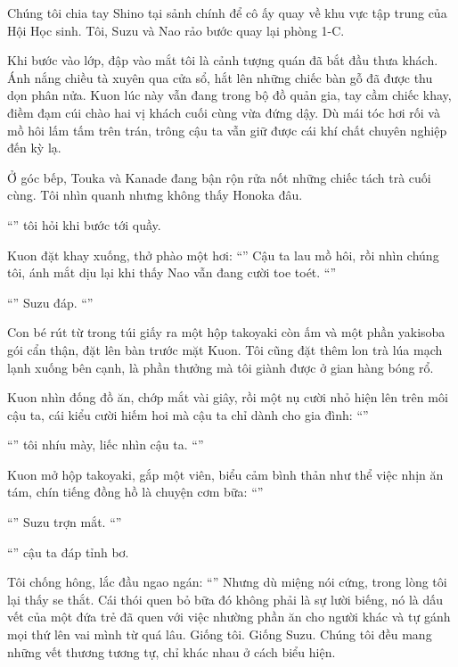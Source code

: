 \documentclass[../main.tex]{subfiles}
\begin{document}
Chúng tôi chia tay Shino tại sảnh chính để cô ấy quay về khu vực tập trung của Hội Học sinh. Tôi, Suzu và Nao rảo bước quay lại phòng 1-C.

Khi bước vào lớp, đập vào mắt tôi là cảnh tượng quán đã bắt đầu thưa khách. Ánh nắng chiều tà xuyên qua cửa sổ, hắt lên những chiếc bàn gỗ đã được thu dọn phân nửa. Kuon lúc này vẫn đang trong bộ đồ quản gia, tay cầm chiếc khay, điềm đạm cúi chào hai vị khách cuối cùng vừa đứng dậy. Dù mái tóc hơi rối và mồ hôi lấm tấm trên trán, trông cậu ta vẫn giữ được cái khí chất chuyên nghiệp đến kỳ lạ.

Ở góc bếp, Touka và Kanade đang bận rộn rửa nốt những chiếc tách trà cuối cùng. Tôi nhìn quanh nhưng không thấy Honoka đâu.

``'' tôi hỏi khi bước tới quầy.

Kuon đặt khay xuống, thở phào một hơi: ``'' Cậu ta lau mồ hôi, rồi nhìn chúng tôi, ánh mắt dịu lại khi thấy Nao vẫn đang cười toe toét. ``''

``'' Suzu đáp. ``''

Con bé rút từ trong túi giấy ra một hộp takoyaki còn ấm và một phần yakisoba gói cẩn thận, đặt lên bàn trước mặt Kuon. Tôi cũng đặt thêm lon trà lúa mạch lạnh xuống bên cạnh, là phần thưởng mà tôi giành được ở gian hàng bóng rổ.

Kuon nhìn đống đồ ăn, chớp mắt vài giây, rồi một nụ cười nhỏ hiện lên trên môi cậu ta, cái kiểu cười hiếm hoi mà cậu ta chỉ dành cho gia đình: ``''

``'' tôi nhíu mày, liếc nhìn cậu ta. ``''

Kuon mở hộp takoyaki, gắp một viên, biểu cảm bình thản như thể việc nhịn ăn tám, chín tiếng đồng hồ là chuyện cơm bữa: ``''

``'' Suzu trợn mắt. ``''

``'' cậu ta đáp tỉnh bơ.

Tôi chống hông, lắc đầu ngao ngán: ``'' Nhưng dù miệng nói cứng, trong lòng tôi lại thấy se thắt. Cái thói quen bỏ bữa đó không phải là sự lười biếng, nó là dấu vết của một đứa trẻ đã quen với việc nhường phần ăn cho người khác và tự gánh mọi thứ lên vai mình từ quá lâu. Giống tôi. Giống Suzu. Chúng tôi đều mang những vết thương tương tự, chỉ khác nhau ở cách biểu hiện.
\end{document}
